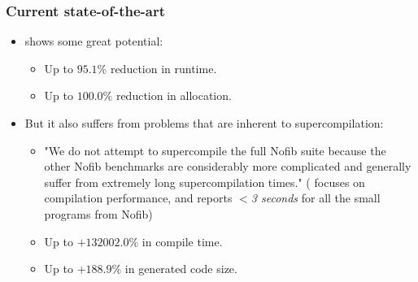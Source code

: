 \documentclass{beamer}
\begin{document}
\begin{frame}
    \frametitle{Current state-of-the-art}

    \begin{itemize}
        \item
            \citet{callbyneed-sc} shows some great potential:
            \begin{itemize}
                \item
                    Up to $95.1\%$ reduction in runtime.
                \item
                    Up to $100.0\%$ reduction in allocation.
            \end{itemize}
        \item
            But it also suffers from problems that are inherent to
            supercompilation:
            \begin{itemize}
                \item
                    "We do not attempt to supercompile the full Nofib suite because the
                    other Nofib benchmarks are considerably more complicated and
                    generally suffer from extremely long supercompilation times."
                    \newline
                    (\citet{timeandspace} focuses on compilation performance,
                    and reports \textit{$<$3 seconds} for all the small programs
                    from Nofib)
                \item
                    Up to $+132002.0\%$ in compile time.
                \item
                    Up to $+188.9\%$ in generated code size.
            \end{itemize}
    \end{itemize}
\end{frame}
\end{document}
